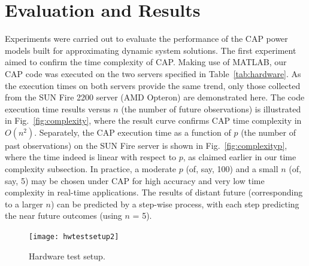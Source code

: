 \documentclass[prodmode,acmtaco,pdftex]{acmsmall}
\newcommand{\figurename}{Fig.}
\begin{document}
\section{Evaluation and Results}
\label{sec:evaluation}
Experiments were carried out to evaluate the performance of the CAP
power models built for approximating dynamic system solutions.  The
first experiment aimed to confirm the time complexity of CAP.  Making
use of MATLAB, our CAP code was executed on the two servers specified in
Table~\ref{tab:hardware}.  As the execution times on both servers
provide the same trend, only those collected from the SUN Fire 2200
server (AMD Opteron) are demonstrated here.  The code execution time
results versus $n$ (the number of future observations) is illustrated in
\figurename~\ref{fig:complexity}, where the result curve confirms CAP
time complexity in $O(n^{2})$.  Separately, the CAP execution time as a
function of $p$ (the number of past observations) on the SUN Fire server
is shown in \figurename~\ref{fig:complexityp}, where the time indeed is
linear with respect to $p$, as claimed earlier in our time complexity
subsection.  In practice, a moderate $p$ (of, say, 100) and a small $n$
(of, say, 5) may be chosen under CAP for high accuracy and very low time
complexity in real-time applications.  The results of distant future
(corresponding to a larger $n$) can be predicted by a step-wise process,
with each step predicting the near future outcomes (using $n$ = 5).
\begin{figure}[tp]
  \centering
  \texttt{[image: hwtestsetup2]}
  \caption{Hardware test setup.}
  \label{fig:hardware}
\end{figure}
\begin{table}%
\end{table}
\end{document}
